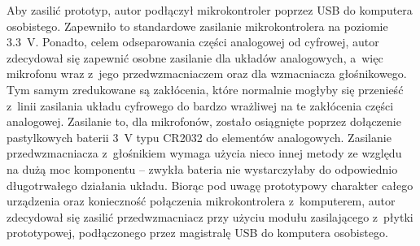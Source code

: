 Aby zasilić prototyp, autor podłączył mikrokontroler poprzez USB do komputera osobistego. Zapewniło to standardowe zasilanie mikrokontrolera na poziomie \SI{3.3}{\V}. Ponadto, celem odseparowania części analogowej od cyfrowej, autor zdecydował się zapewnić osobne zasilanie dla układów analogowych, a~więc mikrofonu wraz z~jego przedwzmacniaczem oraz dla wzmacniacza głośnikowego. Tym samym zredukowane są zakłócenia, które normalnie mogłyby się przenieść z~linii zasilania układu cyfrowego do bardzo wrażliwej na te zakłócenia części analogowej. Zasilanie to, dla mikrofonów, zostało osiągnięte poprzez dołączenie pastylkowych baterii \SI{3}{\V} typu CR2032 do elementów analogowych. Zasilanie przedwzmacniacza z~głośnikiem wymaga użycia nieco innej metody ze względu na dużą moc komponentu -- zwykła bateria nie wystarczyłaby do odpowiednio długotrwałego działania układu. Biorąc pod uwagę prototypowy charakter całego urządzenia oraz konieczność połączenia mikrokontrolera z~komputerem, autor zdecydował się zasilić przedwzmacniacz przy użyciu modułu zasilającego z~płytki prototypowej, podłączonego przez magistralę USB do komputera osobistego.